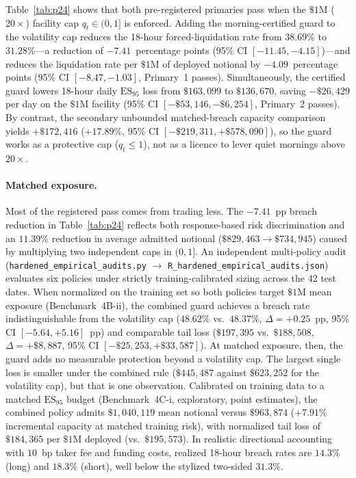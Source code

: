 Table~\ref{tab:p24} shows that both pre-registered primaries pass when the $\$1\text{M}$ ($20\times$) facility cap $q_t\in(0,1]$ is enforced. Adding the morning-certified guard to the volatility cap reduces the 18-hour forced-liquidation rate from $38.69\%$ to $31.28\%$---a reduction of $-7.41$~percentage points (95\% CI $[-11.45,-4.15]$)---and reduces the liquidation rate per $\$1\text{M}$ of deployed notional by $-4.09$~percentage points (95\% CI $[-8.47,-1.03]$, Primary~1 passes). Simultaneously, the certified guard lowers 18-hour daily $\mathrm{ES}_{95}$ loss from $\$163{,}099$ to $\$136{,}670$, saving $-\$26{,}429$ per day on the $\$1\text{M}$ facility (95\% CI $[-\$53{,}146,-\$6{,}254]$, Primary~2 passes). By contrast, the secondary unbounded matched-breach capacity comparison yields $+\$172{,}416$ ($+17.89\%$, 95\% CI $[-\$219{,}311,+\$578{,}090]$), so the guard works as a protective cap ($q_t\le 1$), not as a licence to lever quiet mornings above $20\times$.

\paragraph{Matched exposure.} Most of the registered pass comes from trading less. The $-7.41$~pp breach reduction in Table~\ref{tab:p24} reflects both response-based risk discrimination and an $11.39\%$ reduction in average admitted notional ($\$829{,}463 \to \$734{,}945$) caused by multiplying two independent caps in $(0,1]$. An independent multi-policy audit (\texttt{hardened\_empirical\_audits.py} $\to$ \texttt{R\_hardened\_empirical\_audits.json}) evaluates six policies under strictly training-calibrated sizing across the 42 test dates. When normalized on the training set so both policies target $\$1\text{M}$ mean exposure (Benchmark~4B-ii), the combined guard achieves a breach rate indistinguishable from the volatility cap ($48.62\%$ vs.\ $48.37\%$, $\Delta=+0.25$~pp, 95\% CI $[-5.64,+5.16]$~pp) and comparable tail loss ($\$197{,}395$ vs.\ $\$188{,}508$, $\Delta=+\$8{,}887$, 95\% CI $[-\$25{,}253,+\$33{,}587]$). At matched exposure, then, the guard adds no measurable protection beyond a volatility cap. The largest single loss is smaller under the combined rule ($\$445{,}487$ against $\$623{,}252$ for the volatility cap), but that is one observation. Calibrated on training data to a matched $\mathrm{ES}_{95}$ budget (Benchmark~4C-i, exploratory, point estimates), the combined policy admits $\$1{,}040{,}119$ mean notional versus $\$963{,}874$ ($+7.91\%$ incremental capacity at matched training risk), with normalized tail loss of $\$184{,}365$ per $\$1\text{M}$ deployed (vs.\ $\$195{,}573$). In realistic directional accounting with $10$~bp taker fee and funding costs, realized 18-hour breach rates are $14.3\%$ (long) and $18.3\%$ (short), well below the stylized two-sided $31.3\%$.

